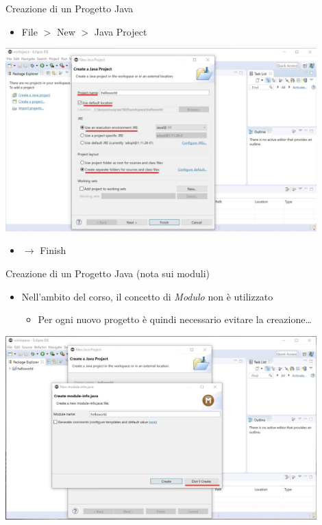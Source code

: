 \documentclass[xcolor=dvipsnames,presentation]{beamer}
\begin{document}
\begin{frame}{Creazione di un Progetto Java}
\begin{itemize}
\item File $>$ New $>$ Java Project
\end{itemize}
\begin{center}
\includegraphics[width=0.9\textwidth]{img/eclipse-screenshots/eclipse-ide-02a.jpg}
\end{center}
\begin{itemize}
\item $\rightarrow$ Finish
\end{itemize}
\end{frame}

\begin{frame}{Creazione di un Progetto Java (nota sui moduli)}
\begin{itemize}
\item Nell'ambito del corso, il concetto di \emph{Modulo} non è utilizzato
\begin{itemize}
\item Per ogni nuovo progetto è quindi necessario evitare la creazione\dots
\end{itemize}
\end{itemize}
\begin{center}
\includegraphics[width=0.9\textwidth]{img/eclipse-screenshots/eclipse-ide-02b.jpg}
\end{center}
\end{frame}
\end{document}
